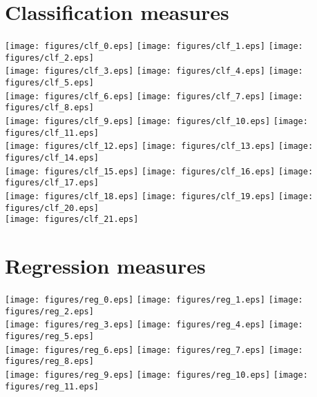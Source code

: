 \documentclass[11pt]{article}
\begin{document}
\section{Classification measures}

\texttt{[image: figures/clf\_0.eps]}%
\texttt{[image: figures/clf\_1.eps]}%
\texttt{[image: figures/clf\_2.eps]}\\
\texttt{[image: figures/clf\_3.eps]}%
\texttt{[image: figures/clf\_4.eps]}%
\texttt{[image: figures/clf\_5.eps]}\\
\texttt{[image: figures/clf\_6.eps]}%
\texttt{[image: figures/clf\_7.eps]}%
\texttt{[image: figures/clf\_8.eps]}\\
\texttt{[image: figures/clf\_9.eps]}%
\texttt{[image: figures/clf\_10.eps]}%
\texttt{[image: figures/clf\_11.eps]}\\
\texttt{[image: figures/clf\_12.eps]}%
\texttt{[image: figures/clf\_13.eps]}%
\texttt{[image: figures/clf\_14.eps]}\\
\texttt{[image: figures/clf\_15.eps]}%
\texttt{[image: figures/clf\_16.eps]}%
\texttt{[image: figures/clf\_17.eps]}\\
\texttt{[image: figures/clf\_18.eps]}%
\texttt{[image: figures/clf\_19.eps]}%
\texttt{[image: figures/clf\_20.eps]}\\
\texttt{[image: figures/clf\_21.eps]}%

\section{Regression measures}

\texttt{[image: figures/reg\_0.eps]}%
\texttt{[image: figures/reg\_1.eps]}%
\texttt{[image: figures/reg\_2.eps]}\\
\texttt{[image: figures/reg\_3.eps]}%
\texttt{[image: figures/reg\_4.eps]}%
\texttt{[image: figures/reg\_5.eps]}\\
\texttt{[image: figures/reg\_6.eps]}%
\texttt{[image: figures/reg\_7.eps]}%
\texttt{[image: figures/reg\_8.eps]}\\
\texttt{[image: figures/reg\_9.eps]}%
\texttt{[image: figures/reg\_10.eps]}%
\texttt{[image: figures/reg\_11.eps]}
\end{document}
